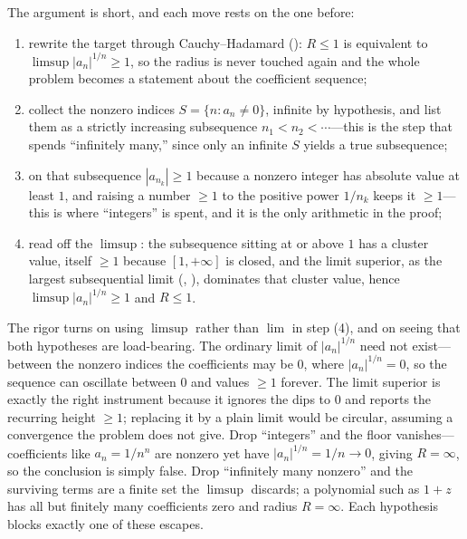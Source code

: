 \documentclass[main.tex]{subfiles}
\begin{document}
\begin{Reflection}
The argument is short, and each move rests on the one before:
\begin{enumerate}[leftmargin=1.7em,itemsep=3pt,topsep=2pt,label=\textnormal{(\arabic*)}]
  \item rewrite the target through Cauchy--Hadamard (): $R\le 1$ is equivalent to
        $\limsup|a_n|^{1/n}\ge 1$, so the radius is never touched again and the whole problem becomes a
        statement about the coefficient sequence;
  \item collect the nonzero indices $S=\{n:a_n\neq 0\}$, infinite by hypothesis, and list them as a
        strictly increasing subsequence $n_1<n_2<\cdots$---this is the step that spends ``infinitely
        many,'' since only an infinite $S$ yields a true subsequence;
  \item on that subsequence $|a_{n_k}|\ge 1$ because a nonzero integer has absolute value at least $1$,
        and raising a number $\ge 1$ to the positive power $1/n_k$ keeps it $\ge 1$---this is where
        ``integers'' is spent, and it is the only arithmetic in the proof;
  \item read off the $\limsup$: the subsequence sitting at or above $1$ has a cluster value, itself
        $\ge 1$ because $[1,+\infty]$ is closed, and the limit superior, as the largest subsequential
        limit (, ), dominates that cluster value, hence
        $\limsup|a_n|^{1/n}\ge 1$ and $R\le 1$.
\end{enumerate}

The rigor turns on using $\limsup$ rather than $\lim$ in step (4), and on seeing that both hypotheses
are load-bearing. The ordinary limit of $|a_n|^{1/n}$ need not exist---between the nonzero indices the
coefficients may be $0$, where $|a_n|^{1/n}=0$, so the sequence can oscillate between $0$ and values
$\ge 1$ forever. The limit superior is exactly the right instrument because it ignores the dips to $0$
and reports the recurring height $\ge 1$; replacing it by a plain limit would be circular, assuming a
convergence the problem does not give. Drop ``integers'' and the floor vanishes---coefficients like
$a_n=1/n^n$ are nonzero yet have $|a_n|^{1/n}=1/n\to 0$, giving $R=\infty$, so the conclusion is simply
false. Drop ``infinitely many nonzero'' and the surviving terms are a finite set the $\limsup$ discards;
a polynomial such as $1+z$ has all but finitely many coefficients zero and radius $R=\infty$. Each
hypothesis blocks exactly one of these escapes.


\end{Reflection}
\end{document}
